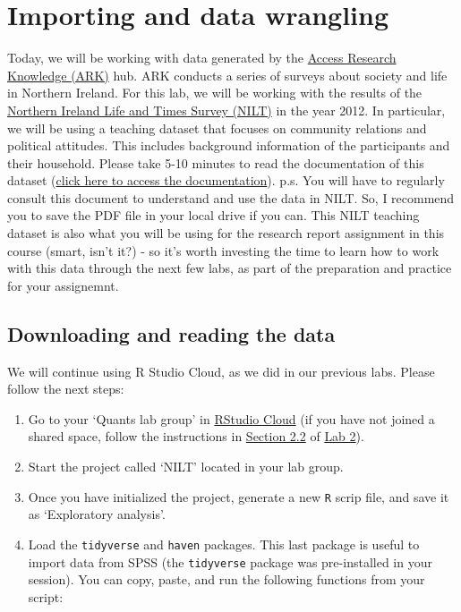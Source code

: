 \documentclass[
]{book}
\providecommand{\tightlist}{%
  \setlength{\itemsep}{0pt}\setlength{\parskip}{0pt}}
\begin{document}
\hypertarget{importing-and-data-wrangling}{%
\section{Importing and data wrangling}\label{importing-and-data-wrangling}}

Today, we will be working with data generated by the \href{https://www.ark.ac.uk/ARK/}{Access Research Knowledge (ARK)} hub. ARK conducts a series of surveys about society and life in Northern Ireland. For this lab, we will be working with the results of the \href{https://www.ark.ac.uk/nilt/}{Northern Ireland Life and Times Survey (NILT)} in the year 2012. In particular, we will be using a teaching dataset that focuses on community relations and political attitudes. This includes background information of the participants and their household. Please take 5-10 minutes to read the documentation of this dataset (\href{https://www.ark.ac.uk/teaching/NILT2012TeachingResources.pdf}{click here to access the documentation}). p.s. You will have to regularly consult this document to understand and use the data in NILT. So, I recommend you to save the PDF file in your local drive if you can. This NILT teaching dataset is also what you will be using for the research report assignment in this course (smart, isn't it?) - so it's worth investing the time to learn how to work with this data through the next few labs, as part of the preparation and practice for your assignemnt.

\hypertarget{downloading-and-reading-the-data-1}{%
\subsection{Downloading and reading the data}\label{downloading-and-reading-the-data-1}}

We will continue using R Studio Cloud, as we did in our previous labs. Please follow the next steps:

\begin{enumerate}
\def\labelenumi{\arabic{enumi}.}
\tightlist
\item
  Go to your `Quants lab group' in \href{https://rstudio.cloud/}{RStudio Cloud} (if you have not joined a shared space, follow the instructions in \protect\hyperlink{learn-packages}{Section 2.2} of \protect\hyperlink{lab2}{Lab 2}).
\item
  Start the project called `NILT' located in your lab group.
\item
  Once you have initialized the project, generate a new \texttt{R} scrip file, and save it as `Exploratory analysis'.
\item
  Load the \texttt{tidyverse} and \texttt{haven} packages. This last package is useful to import data from SPSS (the \texttt{tidyverse} package was pre-installed in your session). You can copy, paste, and run the following functions from your script:
\end{enumerate}
\end{document}

